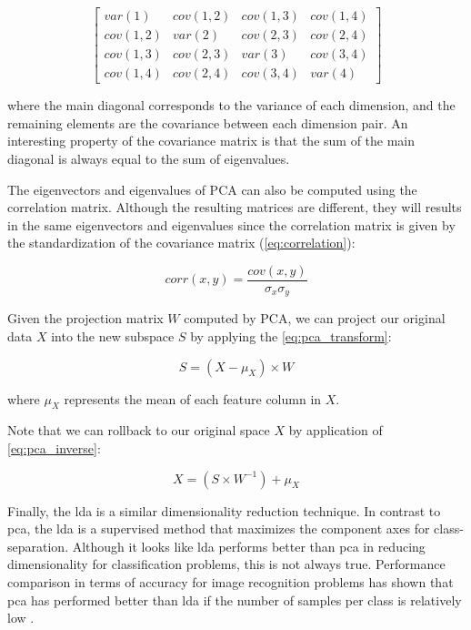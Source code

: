 $$
\begin{bmatrix}var(1) & cov(1,2) & cov(1,3) & cov(1,4) 
\\ cov(1,2) & var(2) & cov(2,3) & cov(2,4)
\\ cov(1,3) & cov(2,3) & var(3) & cov(3,4)
\\ cov(1,4) & cov(2,4) & cov(3,4) & var(4)
\end{bmatrix}
$$

\noindent
where the main diagonal corresponds to the variance of each dimension, and the remaining elements are the covariance between each dimension pair. An interesting property of the covariance matrix is that the sum of the main diagonal is always equal to the sum of eigenvalues.

The eigenvectors and eigenvalues of PCA can also be computed using the correlation matrix. Although the resulting matrices are different, they will results in the same eigenvectors and eigenvalues since the correlation matrix is given by the standardization of the covariance matrix (\autoref{eq:correlation}):

\begin{equation}
\label{eq:correlation}
corr(x,y) = \frac{cov(x,y)}{\sigma_x \sigma_y}
\end{equation}

Given the projection matrix $W$ computed by PCA, we can project our original data $X$ into the new subspace $S$ by applying the \autoref{eq:pca_transform}:

\begin{equation}
\label{eq:pca_transform}
S = (X-\mu_X) \times W
\end{equation}

\noindent
where $\mu_X$ represents the mean of each feature column in $X$.

Note that we can rollback to our original space $X$ by application of \autoref{eq:pca_inverse}:

\begin{equation}
\label{eq:pca_inverse}
X = (S \times W^{-1}) + \mu_X
\end{equation}

Finally, the \acf{lda} \citep{izenman2013linear} is a similar dimensionality reduction technique. In contrast to \acs{pca}, the \acs{lda} is a supervised method that maximizes the component axes for class-separation. Although it looks like \acs{lda} performs better than \acs{pca} in reducing dimensionality for classification problems, this is not always true. Performance comparison in terms of accuracy for image recognition problems has shown that \acs{pca} has performed better than \acs{lda} if the number of samples per class is relatively low \citep{martinez2001pca}.

